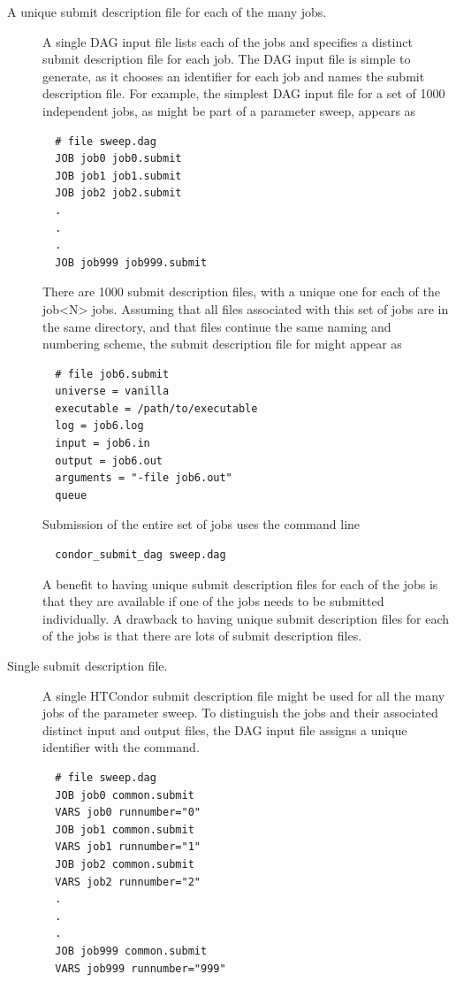 \begin{description}
\item[A unique submit description file for each of the many jobs.]
A single DAG input file lists each of the jobs and specifies
a distinct submit description file for each job.
The DAG input file is simple to generate, as it chooses an
identifier for each job and names the submit description file.
For example, the simplest DAG input file for a set of 1000 independent jobs,
as might be part of a parameter sweep, appears as
\begin{verbatim}
  # file sweep.dag
  JOB job0 job0.submit
  JOB job1 job1.submit
  JOB job2 job2.submit
  .
  .
  .
  JOB job999 job999.submit
\end{verbatim}
There are 1000 submit description files, with a unique one for
each of the job<N> jobs.
Assuming that all files associated with this set of jobs are in the
same directory, and that files continue the same naming and numbering
scheme, the submit description file for 
might appear as
\begin{verbatim}
  # file job6.submit
  universe = vanilla
  executable = /path/to/executable
  log = job6.log
  input = job6.in
  output = job6.out
  arguments = "-file job6.out"
  queue
\end{verbatim}

Submission of the entire set of jobs uses the command line
\begin{verbatim}
  condor_submit_dag sweep.dag
\end{verbatim}

A benefit to having unique submit description files for each of the
jobs is that they are available if one of the jobs needs to be
submitted individually.
A drawback to having unique submit description files for each of the jobs
is that there are lots of submit description files.

\item[Single submit description file.]
A single HTCondor submit description file might be used for all the many
jobs of the parameter sweep.
To distinguish the jobs and their associated distinct input and output files,
the DAG input file assigns a unique identifier with the  command.
\begin{verbatim}
  # file sweep.dag
  JOB job0 common.submit
  VARS job0 runnumber="0"
  JOB job1 common.submit
  VARS job1 runnumber="1"
  JOB job2 common.submit
  VARS job2 runnumber="2"
  .
  .
  .
  JOB job999 common.submit
  VARS job999 runnumber="999"
\end{verbatim}


\end{description}
